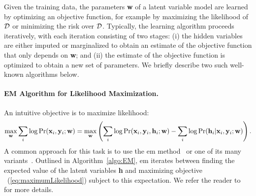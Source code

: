 \documentclass{article}
\begin{document}
Given the training data, the parameters {\bf w} of a latent variable model are learned by optimizing
an objective function, for example by maximizing the likelihood of ${\cal D}$ or minimizing the risk over ${\cal D}$. Typically,
the learning algorithm proceeds iteratively, with each iteration consisting of two stages: (i) the hidden variables are either imputed
or marginalized to obtain an estimate of the objective function that only depends on {\bf w};
and (ii) the estimate of the objective function is optimized to obtain a new set of parameters. We briefly describe two such well-known
algorithms below.

\paragraph{EM Algorithm for Likelihood Maximization.} An intuitive objective is to maximize likelihood:
\begin{equation}
\max_{\bf w} \sum_i \log \Pr({\bf x}_i, {\bf y}_i; {\bf w}) = 
\max_{\bf w} \left( \sum_i \log \Pr({\bf x}_i, {\bf y}_i, {\bf h}_i; {\bf w}) - 
\sum_i \log \Pr({\bf h}_i | {\bf x}_i, {\bf y}_i; {\bf w})\right).
\label{eq:maximumLikelihood}
\end{equation}
A common approach for this task is to use the {\sc
em} method~\cite{dempsterjrss77} or one of its many
variants~\cite{gelman95}.  Outlined in Algorithm~\ref{algo:EM}, {\sc
em} iterates between finding the expected value of the latent variables
{\bf h} and maximizing objective ~(\ref{eq:maximumLikelihood})
subject to this expectation.
We refer the reader to~\cite{dempsterjrss77} for more details.
\end{document}
